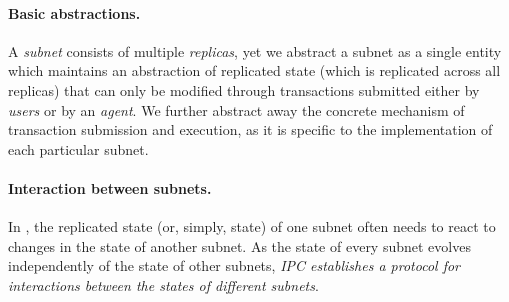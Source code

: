 


\paragraph{Basic abstractions.}
A \emph{subnet} consists of multiple \emph{replicas}, yet we abstract a subnet as a single entity which maintains an  abstraction of replicated state (which is replicated across all replicas)
that can only be modified through transactions submitted either by  \emph{users} or by an \emph{\ipc agent}.
We further abstract away the concrete mechanism of transaction submission and execution, as it is specific to the implementation of each particular subnet.

\paragraph{Interaction between subnets.}
In \ipc, the replicated state (or, simply, state) of one subnet often needs to react to changes in the state of another subnet.
As the state of every subnet  evolves independently of the state of other subnets,
\emph{IPC establishes a protocol for interactions between the states of different subnets}.


